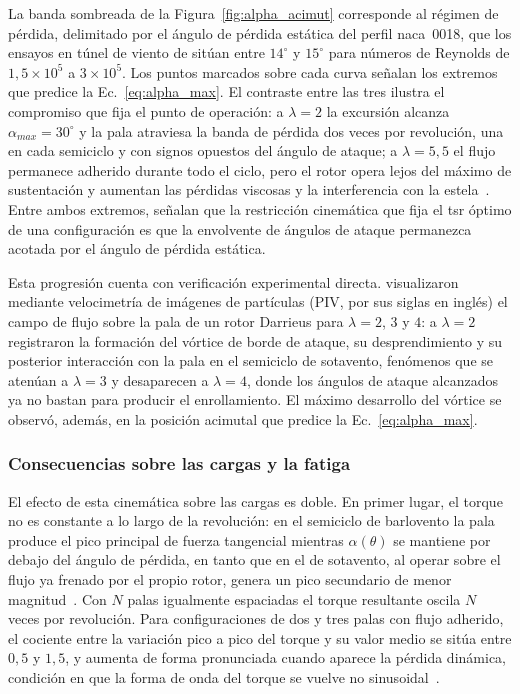 La banda sombreada de la Figura~\ref{fig:alpha_acimut} corresponde al régimen de pérdida, delimitado por el ángulo de pérdida estática del perfil \gls{naca}~0018, que los ensayos en túnel de viento de \textcite{Bianchini2015} sitúan entre $14^\circ$ y $15^\circ$ para números de Reynolds de $1{,}5\times10^5$ a $3\times10^5$. Los puntos marcados sobre cada curva señalan los extremos que predice la Ec.~\ref{eq:alpha_max}. El contraste entre las tres ilustra el compromiso que fija el punto de operación: a $\lambda = 2$ la excursión alcanza $\alpha_{max} = 30^\circ$ y la pala atraviesa la banda de pérdida dos veces por revolución, una en cada semiciclo y con signos opuestos del ángulo de ataque; a $\lambda = 5{,}5$ el flujo permanece adherido durante todo el ciclo, pero el rotor opera lejos del máximo de sustentación y aumentan las pérdidas viscosas y la interferencia con la estela~\parencite{Essahraoui2026}. Entre ambos extremos, \textcite{Essahraoui2026} señalan que la restricción cinemática que fija el \gls{tsr} óptimo de una configuración es que la envolvente de ángulos de ataque permanezca acotada por el ángulo de pérdida estática.

Esta progresión cuenta con verificación experimental directa. \textcite{Ferreira2009} visualizaron mediante velocimetría de imágenes de partículas (PIV, por sus siglas en inglés) el campo de flujo sobre la pala de un rotor Darrieus para $\lambda = 2$, $3$ y $4$: a $\lambda = 2$ registraron la formación del vórtice de borde de ataque, su desprendimiento y su posterior interacción con la pala en el semiciclo de sotavento, fenómenos que se atenúan a $\lambda = 3$ y desaparecen a $\lambda = 4$, donde los ángulos de ataque alcanzados ya no bastan para producir el enrollamiento. El máximo desarrollo del vórtice se observó, además, en la posición acimutal que predice la Ec.~\ref{eq:alpha_max}.

\subsubsection{Consecuencias sobre las cargas y la fatiga}

El efecto de esta cinemática sobre las cargas es doble. En primer lugar, el torque no es constante a lo largo de la revolución: en el semiciclo de barlovento la pala produce el pico principal de fuerza tangencial mientras $\alpha(\theta)$ se mantiene por debajo del ángulo de pérdida, en tanto que en el de sotavento, al operar sobre el flujo ya frenado por el propio rotor, genera un pico secundario de menor magnitud~\parencite{Essahraoui2026}. Con $N$ palas igualmente espaciadas el torque resultante oscila $N$ veces por revolución. Para configuraciones de dos y tres palas con flujo adherido, el cociente entre la variación pico a pico del torque y su valor medio se sitúa entre $0{,}5$ y $1{,}5$, y aumenta de forma pronunciada cuando aparece la pérdida dinámica, condición en que la forma de onda del torque se vuelve no sinusoidal~\parencite{Essahraoui2026}.

